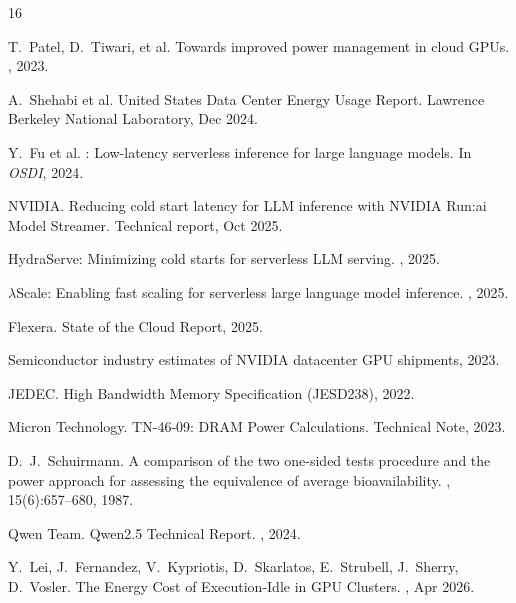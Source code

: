 \documentclass[sigconf,anonymous,review]{acmart}
\begin{document}

\def\bibfont{\normalsize}
\begin{thebibliography}{16}

T.~Patel, D.~Tiwari, et al.
\newblock Towards improved power management in cloud GPUs.
, 2023.

A.~Shehabi et al.
 United States Data Center Energy Usage Report.
\newblock Lawrence Berkeley National Laboratory, Dec 2024.

Y.~Fu et al.
: Low-latency serverless inference for large language models.
\newblock In {\em OSDI}, 2024.

NVIDIA.
\newblock Reducing cold start latency for LLM inference with {NVIDIA Run:ai} Model Streamer.
\newblock Technical report, Oct 2025.

HydraServe: Minimizing cold starts for serverless LLM serving.
, 2025.

$\lambda$Scale: Enabling fast scaling for serverless large language model inference.
, 2025.

Flexera.
 State of the Cloud Report, 2025.

Semiconductor industry estimates of NVIDIA datacenter GPU shipments, 2023.

JEDEC.
 High Bandwidth Memory Specification ({JESD238}), 2022.

Micron Technology.
\newblock TN-46-09: DRAM Power Calculations.
\newblock Technical Note, 2023.

D.~J.~Schuirmann.
\newblock A comparison of the two one-sided tests procedure and the power approach for assessing the equivalence of average bioavailability.
, 15(6):657--680, 1987.

Qwen Team.
\newblock Qwen2.5 Technical Report.
, 2024.

Y.~Lei, J.~Fernandez, V.~Kypriotis, D.~Skarlatos, E.~Strubell, J.~Sherry, D.~Vosler.
\newblock The Energy Cost of Execution-Idle in {GPU} Clusters.
, Apr 2026.


\end{thebibliography}
\end{document}
